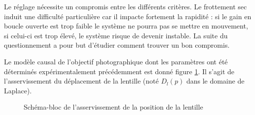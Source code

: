 Le réglage nécessite un compromis
entre les différents critères. Le frottement sec induit une difficulté
particulière car il impacte fortement la rapidité : si le gain en boucle
ouverte est trop faible le système ne pourra pas se mettre en mouvement,
si celui-ci est trop élevé, le système risque de devenir instable. La
suite du questionnement a pour but d'étudier comment trouver un bon
compromis.

Le modèle causal de l'objectif photographique dont les paramètres ont
été déterminés expérimentalement précédemment est donné figure \ref{fig14}. Il s'agit de l'asservissement du déplacement de la lentille (noté $D_l(p)$ dans le domaine de Laplace).

\begin{figure}[!htb]
\begin{center}
\begin{large}
\end{large}
\caption{Schéma-bloc de l'asservissement de la position de la lentille \label{fig14}}
\end{center}
\end{figure}



